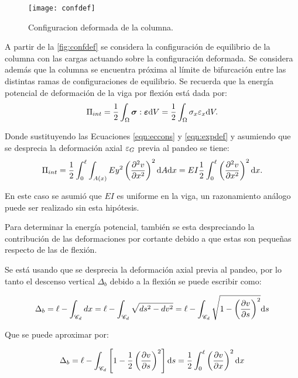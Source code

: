 \begin{figure}[htb]
	\centering
	\texttt{[image: confdef]}
	\caption{Configuracion deformada de la columna.}
	\label{fig:confdef}
\end{figure}

A partir de la \autoref{fig:confdef} se considera la configuración de equilibrio de la columna con las cargas actuando sobre la configuración deformada. Se considera además que la columna se encuentra próxima al límite de bifurcación entre las distintas ramas de configuraciones de equilibrio.
Se recuerda que la energía potencial de deformación de la viga por flexión está dada por:
%
\begin{equation}
\Pi_{int} = \frac{1}{2} \int_\Omega \boldsymbol{\sigma} : \boldsymbol{\varepsilon}  {\text{d}} V  = \frac{1}{2} \int_\Omega \sigma_x \varepsilon_x  {\text{d}} V. 
\end{equation}

Donde sustituyendo las Ecuaciones \eqref{eqn:eccons} y \eqref{eqn:expdef} y asumiendo que se desprecia la deformación axial $\varepsilon_G$ previa al pandeo se tiene:
%
\begin{equation}
\Pi_{int} = \frac{1}{2} \int_0^\ell \int_{A(x)} E y^2 \left( \frac{\partial^2 v}{\partial x^2}\right)^2  {\text{d}} A {\text{d}} x 
=  E I  \frac{1}{2} \int_0^\ell \left( \frac{\partial^2 v}{\partial x^2}\right)^2 {\text{d}} x.
\end{equation}

En este caso se asumió que $EI$ es uniforme en la viga, un razonamiento análogo puede ser realizado sin esta hipótesis.

Para determinar la energía potencial, también se esta despreciando la contribución de las deformaciones por cortante debido a que estas son pequeñas respecto de las de flexión.

Se está usando que se desprecia la deformación axial previa al pandeo, por lo tanto el descenso vertical $\Delta_b$ debido a la flexión se puede escribir como:

\begin{equation}
\Delta_b = \ell - \int_{\mathscr{C}_d} dx = \ell - \int_{\mathscr{C}_d} \sqrt{ds^2-dv^2} = \ell - 
\int_{\mathscr{C}_d} \sqrt{1-\left(\frac{\partial v}{\partial s}\right)^2} {\text{d}} s
\end{equation}

Que se puede aproximar por:

\begin{equation}\label{eqn:deltab}
\Delta_b = \ell - \int_{\mathscr{C}_d} \left[1 - \frac{1}{2}\left(\frac{\partial v}{\partial s}\right)^2\right] {\text{d}} s = \frac{1}{2} \int_0^\ell \left(\frac{\partial v}{\partial x}\right)^2 {\text{d}} x
\end{equation}

